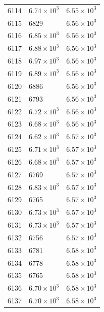 \begin{table}[H]
\begin{tabular}{lll}
6114 & $\displaystyle 6.74 \times 10^{3}$ & $\displaystyle 6.55 \times 10^{3}$ \\
6115 & 6829 & $\displaystyle 6.56 \times 10^{3}$ \\
6116 & $\displaystyle 6.85 \times 10^{3}$ & $\displaystyle 6.56 \times 10^{3}$ \\
6117 & $\displaystyle 6.88 \times 10^{3}$ & $\displaystyle 6.56 \times 10^{3}$ \\
6118 & $\displaystyle 6.97 \times 10^{3}$ & $\displaystyle 6.56 \times 10^{3}$ \\
6119 & $\displaystyle 6.89 \times 10^{3}$ & $\displaystyle 6.56 \times 10^{3}$ \\
6120 & 6886 & $\displaystyle 6.56 \times 10^{3}$ \\
6121 & 6793 & $\displaystyle 6.56 \times 10^{3}$ \\
6122 & $\displaystyle 6.72 \times 10^{3}$ & $\displaystyle 6.56 \times 10^{3}$ \\
6123 & $\displaystyle 6.68 \times 10^{3}$ & $\displaystyle 6.56 \times 10^{3}$ \\
6124 & $\displaystyle 6.62 \times 10^{3}$ & $\displaystyle 6.57 \times 10^{3}$ \\
6125 & $\displaystyle 6.71 \times 10^{3}$ & $\displaystyle 6.57 \times 10^{3}$ \\
6126 & $\displaystyle 6.68 \times 10^{3}$ & $\displaystyle 6.57 \times 10^{3}$ \\
6127 & 6769 & $\displaystyle 6.57 \times 10^{3}$ \\
6128 & $\displaystyle 6.83 \times 10^{3}$ & $\displaystyle 6.57 \times 10^{3}$ \\
6129 & 6765 & $\displaystyle 6.57 \times 10^{3}$ \\
6130 & $\displaystyle 6.73 \times 10^{3}$ & $\displaystyle 6.57 \times 10^{3}$ \\
6131 & $\displaystyle 6.73 \times 10^{3}$ & $\displaystyle 6.57 \times 10^{3}$ \\
6132 & 6756 & $\displaystyle 6.57 \times 10^{3}$ \\
6133 & 6781 & $\displaystyle 6.58 \times 10^{3}$ \\
6134 & 6778 & $\displaystyle 6.58 \times 10^{3}$ \\
6135 & 6765 & $\displaystyle 6.58 \times 10^{3}$ \\
6136 & $\displaystyle 6.70 \times 10^{3}$ & $\displaystyle 6.58 \times 10^{3}$ \\
6137 & $\displaystyle 6.70 \times 10^{3}$ & $\displaystyle 6.58 \times 10^{3}$ \\

\end{tabular}
\end{table}
